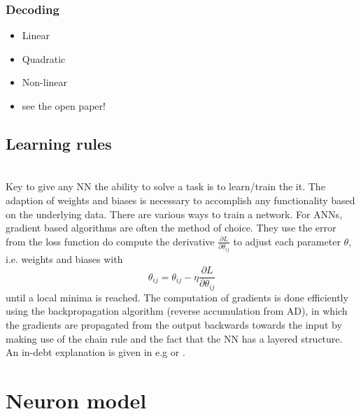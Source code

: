 \subsubsection{Decoding}
	\begin{itemize}
	\item Linear
	\item Quadratic
	\item Non-linear
	\item see the open paper!
	\end{itemize}



 \subsection{Learning rules}
 \\

 Key to give any \ac{NN} the ability to solve a task is to learn/train the it. The adaption of weights and biases is necessary to accomplish any functionality based on the underlying data\cite{zheng_introductory_2022}. There are various ways to train a network. For \acp{ANN}, gradient based algorithms are often the method of choice. They use the error from the loss function do compute the derivative $\frac{\partial L}{\partial \theta_{ij}}$ to adjust each parameter $\theta$, i.e. weights and biases with
 \begin{equation}
 	\theta_{ij} = \theta_{ij} - \eta \frac{\partial L}{\partial \theta_{ij}}
 \end{equation}
 until a local minima is reached. The computation of gradients is done efficiently using the backpropagation algorithm (reverse accumulation from \ac{AD}), in which the gradients are propagated from the output backwards towards the input by making use of the chain rule and the fact that the \ac{NN} has a layered structure. An in-debt explanation is given in e.g \cite{goodfellow_deep_2016} or \cite{nielsen_neural_2015}.





\section{Neuron model}

